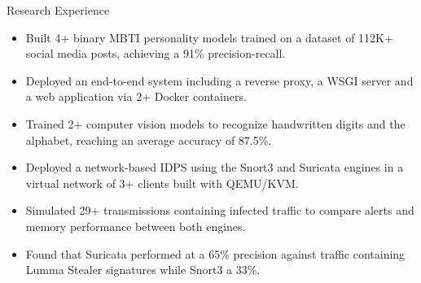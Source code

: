 \begin{researchSection}{Research Experience}

    \researchItem[
        company={NASA New York Space Grant Consortium},
        location={New York, NY},
        position={Machine Learning Researcher},
        duration={Jan 2026 -- May 2026}
    ]
    \begin{itemize}
        \itemsep -6pt {}
        \item Built 4+ binary MBTI personality models trained on a dataset of 112K+ social media posts, achieving a 91\% precision-recall.
        \item Deployed an end-to-end system including a reverse proxy, a WSGI server and a web application via 2+ Docker containers.
        \item Trained 2+ computer vision models to recognize handwritten digits and the alphabet, reaching an average accuracy of 87.5\%.
    \end{itemize}

    \experienceItem[
        company={Queensborough Community College},
        location={Bayside, NY},
        position={Undergraduate Research Scholar},
        duration={September 2025 -- May 2026}
    ]
    \begin{itemize}
        \itemsep -6pt {}
        \item Deployed a network-based IDPS using the Snort3 and Suricata engines in a virtual network of 3+ clients built with QEMU/KVM.
        \item Simulated 29+ transmissions containing infected traffic to compare alerts and memory performance between both engines.
        \item Found that Suricata performed at a 65\% precision against traffic containing Lumma Stealer signatures while Snort3 a 33\%.
    \end{itemize}
\end{researchSection}
